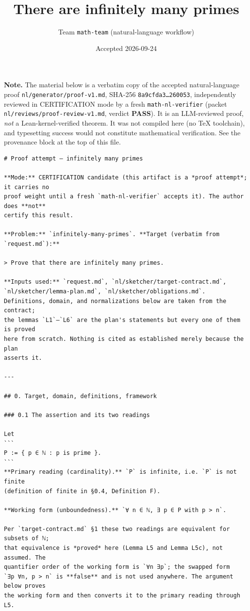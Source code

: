\documentclass[11pt]{article}
\title{There are infinitely many primes}
\author{Team \texttt{math-team} (natural-language workflow)}
\date{Accepted 2026-09-24}
\begin{document}
\maketitle

\noindent\textbf{Note.} The material below is a verbatim copy of the accepted
natural-language proof \texttt{nl/generator/proof-v1.md}, SHA-256
\texttt{8a9cfda3\dots 260053}, independently reviewed in CERTIFICATION mode by a
fresh \texttt{math-nl-verifier} (packet \texttt{nl/reviews/proof-review-v1.md},
verdict \textbf{PASS}). It is an LLM-reviewed proof, \emph{not} a
Lean-kernel-verified theorem. It was not compiled here (no TeX toolchain), and
typesetting success would not constitute mathematical verification. See the
provenance block at the top of this file.

\begin{verbatim}
# Proof attempt — infinitely many primes

**Mode:** CERTIFICATION candidate (this artifact is a *proof attempt*; it carries no
proof weight until a fresh `math-nl-verifier` accepts it). The author does **not**
certify this result.

**Problem:** `infinitely-many-primes`. **Target (verbatim from `request.md`):**

> Prove that there are infinitely many primes.

**Inputs used:** `request.md`, `nl/sketcher/target-contract.md`,
`nl/sketcher/lemma-plan.md`, `nl/sketcher/obligations.md`.
Definitions, domain, and normalizations below are taken from the contract;
the lemmas `L1`–`L6` are the plan's statements but every one of them is proved
here from scratch. Nothing is cited as established merely because the plan
asserts it.

---

## 0. Target, domain, definitions, framework

### 0.1 The assertion and its two readings

Let
```
P := { p ∈ ℕ : p is prime }.
```
**Primary reading (cardinality).** `P` is infinite, i.e. `P` is not finite
(definition of finite in §0.4, Definition F).

**Working form (unboundedness).** `∀ n ∈ ℕ, ∃ p ∈ P with p > n`.

Per `target-contract.md` §1 these two readings are equivalent for subsets of ℕ;
that equivalence is *proved* here (Lemma L5 and Lemma L5c), not assumed. The
quantifier order of the working form is `∀n ∃p`; the swapped form
`∃p ∀n, p > n` is **false** and is not used anywhere. The argument below proves
the working form and then converts it to the primary reading through L5.


\end{verbatim}
\end{document}
